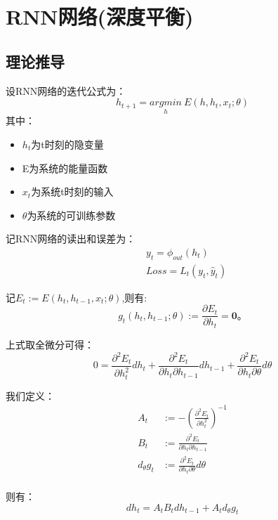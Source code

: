 \documentclass[UTF8]{ctexart}   %
\newcommand{\ptl}[2]{\frac{\partial #1}{\partial #2}}
\begin{document}
\section{RNN网络(深度平衡)}
    \subsection{理论推导}
        设RNN网络的迭代公式为：
        \begin{equation}
            h_{t+1} = \underset{h}{argmin}~E(h, h_t, x_t;\theta)
        \end{equation}
        其中：
        \begin{itemize}
            \item $h_t$为t时刻的隐变量
            \item E为系统的能量函数
            \item $x_t$为系统t时刻的输入
            \item $\theta$为系统的可训练参数
        \end{itemize}

        记RNN网络的读出和误差为：
        \begin{align}
            &y_t = \phi_{out}(h_t)\\
            &Loss = L_t(y_t, \hat{y}_t)
        \end{align}

        记$E_t := E(h_t, h_{t-1}, x_t;\theta)$,则有:
        \begin{equation}
            g_t(h_t, h_{t-1};\theta) := \ptl{E_t}{h_t} = \mathbf{0}。
        \end{equation}

        上式取全微分可得：
        \begin{equation}
            0 = \ptl{^2 E_t}{h_t^2} dh_t + \ptl{^2E_t}{h_t \partial h_{t-1}} dh_{t-1} + \ptl{^2 E_t}{h_t \partial \theta} d\theta
        \end{equation}

        我们定义：
        \begin{align}
            A_t &:= -\left(\ptl{^2 E_t}{h_t^2}\right)^{-1}\\
            B_t &:= \ptl{^2 E_t}{h_t \partial h_{t-1}}\\
            d_\theta g_t &:= \ptl{^2 E_t}{h_t \partial \theta} d\theta\\
        \end{align}

        则有：
        \begin{equation}
            dh_t = A_t B_t dh_{t-1} + A_t d_\theta g_t
        \end{equation}
\end{document}
